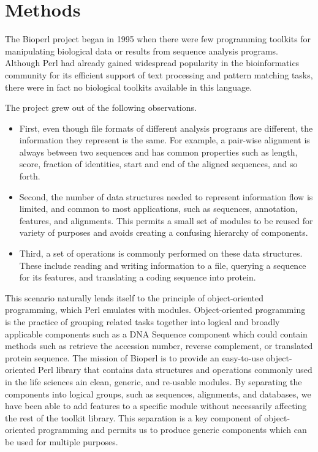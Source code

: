 \documentclass[12pt]{article}
\begin{document}
\section{Methods}

The Bioperl project began in 1995 \cite{chervitz-bits} when there were
few programming toolkits for manipulating biological data or results
from sequence analysis programs.  Although Perl had already gained
widespread popularity in the bioinformatics community for its
efficient support of text processing and pattern matching tasks, there
were in fact no biological toolkits available in this language.

The project grew out of the following observations.  
\begin{itemize}

\item First, even though file formats of different analysis programs
are different, the information they represent is the same.  For
example, a pair-wise alignment is always between two sequences and has
common properties such as length, score, fraction of identities, start
and end of the aligned sequences, and so forth.

\item Second, the number of data structures needed to represent
information flow is limited, and common to most applications, such as
sequences, annotation, features, and alignments.  This permits a small
set of modules to be reused for variety of purposes and avoids
creating a confusing hierarchy of components.

\item Third, a set of operations is commonly performed on these data
structures.  These include reading and writing information to a file,
querying a sequence for its features, and translating a coding
sequence into protein.

\end{itemize}

This scenario naturally lends itself to the principle of
object-oriented programming, which Perl emulates with modules.
Object-oriented programming is the practice of grouping related tasks
together into logical and broadly applicable components such as a DNA
Sequence component which could contain methods such as retrieve the
accession number, reverse complement, or translated protein sequence.
The mission of Bioperl is to provide an easy-to-use object-oriented
Perl library that contains data structures and operations commonly
used in the life sciences ain clean, generic, and re-usable modules.
By separating the components into logical groups, such as sequences,
alignments, and databases, we have been able to add features to a
specific module without necessarily affecting the rest of the toolkit
library.  This separation is a key component of object-oriented
programming and permits us to produce generic components which can be
used for multiple purposes.  
\end{document}
